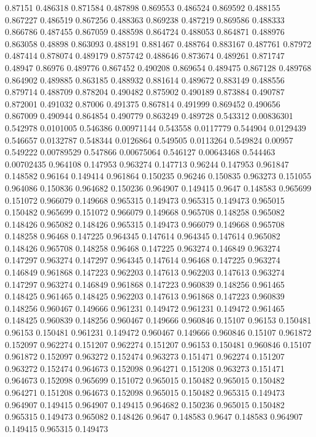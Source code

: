 0.87151 0.486318
0.871584 0.487898
0.869553 0.486524
0.869592 0.488155
0.867227 0.486519
0.867256 0.488363
0.869238 0.487219
0.869586 0.488333
0.866786 0.487455
0.867059 0.488598
0.864724 0.488053
0.864871 0.488976
0.863058 0.48898
0.863093 0.488191
0.881467 0.488764
0.883167 0.487761
0.87972 0.487414
0.878074 0.489179
0.875742 0.488646
0.873674 0.489261
0.871747 0.48947
0.86976 0.489776
0.867452 0.490208
0.869654 0.489475
0.867128 0.489768
0.864902 0.489885
0.863185 0.488932
0.881614 0.489672
0.883149 0.488556
0.879714 0.488709
0.878204 0.490482
0.875902 0.490189
0.873884 0.490787
0.872001 0.491032
0.87006 0.491375
0.867814 0.491999
0.869452 0.490656
0.867009 0.490944
0.864854 0.490779
0.863249 0.489728
0.543312 0.00836301
0.542978 0.0101005
0.546386 0.00971144
0.543558 0.0117779
0.544904 0.0129439
0.546657 0.0132787
0.548344 0.0126864
0.549505 0.0113264
0.549824 0.00957
0.549222 0.00789529
0.547866 0.00675064
0.546127 0.00643468
0.544463 0.00702435
0.964108 0.147953
0.963274 0.147713
0.96244 0.147953
0.961847 0.148582
0.96164 0.149414
0.961864 0.150235
0.96246 0.150835
0.963273 0.151055
0.964086 0.150836
0.964682 0.150236
0.964907 0.149415
0.9647 0.148583
0.965699 0.151072
0.966079 0.149668
0.965315 0.149473
0.965315 0.149473
0.965015 0.150482
0.965699 0.151072
0.966079 0.149668
0.965708 0.148258
0.965082 0.148426
0.965082 0.148426
0.965315 0.149473
0.966079 0.149668
0.965708 0.148258
0.96468 0.147225
0.964345 0.147614
0.964345 0.147614
0.965082 0.148426
0.965708 0.148258
0.96468 0.147225
0.963274 0.146849
0.963274 0.147297
0.963274 0.147297
0.964345 0.147614
0.96468 0.147225
0.963274 0.146849
0.961868 0.147223
0.962203 0.147613
0.962203 0.147613
0.963274 0.147297
0.963274 0.146849
0.961868 0.147223
0.960839 0.148256
0.961465 0.148425
0.961465 0.148425
0.962203 0.147613
0.961868 0.147223
0.960839 0.148256
0.960467 0.149666
0.961231 0.149472
0.961231 0.149472
0.961465 0.148425
0.960839 0.148256
0.960467 0.149666
0.960846 0.15107
0.96153 0.150481
0.96153 0.150481
0.961231 0.149472
0.960467 0.149666
0.960846 0.15107
0.961872 0.152097
0.962274 0.151207
0.962274 0.151207
0.96153 0.150481
0.960846 0.15107
0.961872 0.152097
0.963272 0.152474
0.963273 0.151471
0.962274 0.151207
0.963272 0.152474
0.964673 0.152098
0.964271 0.151208
0.963273 0.151471
0.964673 0.152098
0.965699 0.151072
0.965015 0.150482
0.965015 0.150482
0.964271 0.151208
0.964673 0.152098
0.965015 0.150482
0.965315 0.149473
0.964907 0.149415
0.964907 0.149415
0.964682 0.150236
0.965015 0.150482
0.965315 0.149473
0.965082 0.148426
0.9647 0.148583
0.9647 0.148583
0.964907 0.149415
0.965315 0.149473
